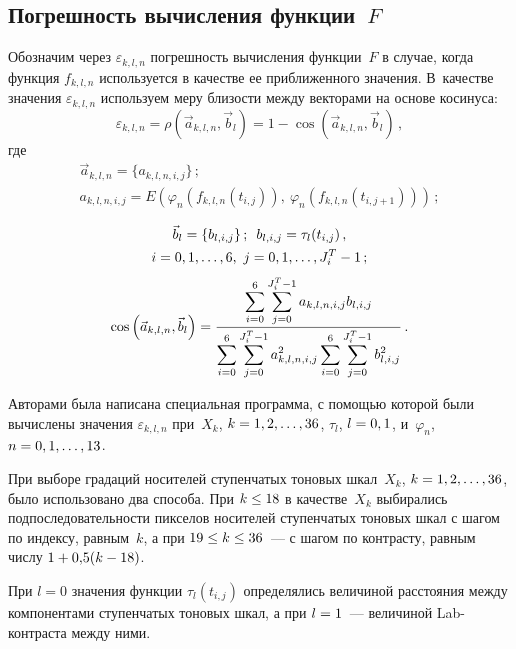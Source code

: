 \begin{multicols}{2}
\section{Погрешность вычисления функции~$F$}

  Обозначим через $\varepsilon_{k,l,n}$ погрешность вычисления функции~$F$ в 
случае, когда функция $f_{k,l,n}$ используется в качестве ее приближенного 
значения. В~качестве значения $\varepsilon_{k,l,n}$ используем меру бли\-зости 
между векторами на основе косинуса:
  $$
  \varepsilon_{k,l,n} =\rho\left(\vec{a}_{k,l,n},\vec{b}_l\right) =1-\cos \left( 
\vec{a}_{k,l,n},\vec{b}_l\right)\,,
  $$
где
\begin{multline*}
\vec{a}_{k,l,n}= \{a_{k,l,n,i,j}\}\,;\\ 
a_{k,l,n,i,j} =  E(\varphi_n(f_{k,l,n}(t_{i,j})),\ 
\varphi_n(f_{k,l,n}(t_{i,j+1})))\,;
\end{multline*}

\vspace*{-12pt}

\noindent
\begin{multline*}
\vec{b}_l = \{b_{l,i,j}\}\,;\enskip
b_{l,i,j} = \tau_l(t_{i,j})\,,\\ i = 0, 1, \ldots , 6,\ j = 0, 1, \ldots ,  J^T_i-1\,;
\end{multline*}
$$
\cos\left( \vec{a}_{k,l,n},\vec{b}_l\right) = 
\displaystyle\frac{\displaystyle \sum\limits_{i=0}^6 \sum\limits_{j=0}^{J_i^T-1} a_{k,l,n,i,j} b_{l,i,j}\mathstrut}{\displaystyle \sum\limits_{i=0}^6 \sum\limits_{j=0}^{J^T_i-1} a^2_{k,l,n,i,j} 
\sum\limits_{i=0}^6 \sum\limits_{j=0}^{J_i^T-1} b^2_{l,i,j}\mathstrut}\,.
$$


  
  Авторами была написана специальная программа, с помощью которой были 
вычислены значения $\varepsilon_{k,l,n}$ при~$X_k$, $k \hm= 1, 2, \ldots, 36$, 
$\tau_l$, $l \hm= 0, 1$, и~$\varphi_n$, $n \hm= 0, 1, \ldots , 13$.
  
  При выборе градаций носителей ступенчатых тоновых шкал~$X_k$, $k \hm= 
1, 2, \ldots , 36$, было использовано два способа. При $k \hm\leq 18$ в 
качестве~$X_k$ выбирались подпоследовательности пикселов носителей 
ступенчатых тоновых шкал с шагом по индексу, равным~$k$, а при $19 \hm\leq 
k \hm\leq 36$~--- с шагом по контрасту, равным числу $1\hm+0{,}5 (k \hm - 
18)$. 
  
  При $l = 0$ значения функции $\tau_{l}(t_{i,j})$ определялись величиной 
расстояния между компонентами ступенчатых тоновых шкал, а при $l \hm= 
1$~---  величиной Lab-конт\-рас\-та между ними.
  

\end{multicols}
